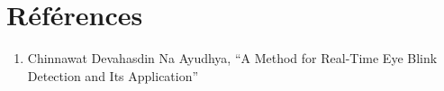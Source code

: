 \section{Références}

\begin{enumerate}
 \item Chinnawat Devahasdin Na Ayudhya, \enquote{A Method for Real-Time Eye Blink Detection and Its Application}
\end{enumerate}
